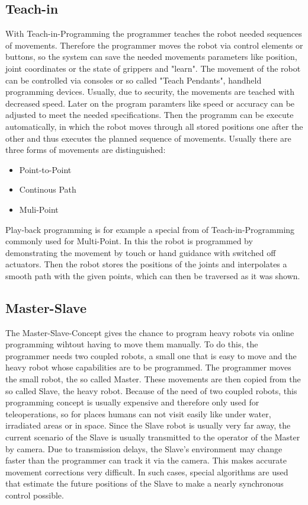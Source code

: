 \documentclass[conference]{IEEEtran}
\begin{document}
    \subsection{Teach-in}
        With Teach-in-Programming the programmer teaches the robot needed sequences of movements. Therefore the programmer moves the robot via control elements or buttons, so the system can save the needed movements parameters like position, joint coordinates or the state of grippers and "learn". The movement of the robot can be controlled via consoles or so called "Teach Pendants", handheld programming devices. %
        Usually, due to security, the movements are teached with decreased speed. Later on the program paramters like speed or accuracy can be adjusted to meet the needed specifications. Then the programm can be execute automatically, in which the robot moves through all stored positions one after the other and thus executes the planned sequence of movements. \cite[pp. 187-188]{b4} %
        Usually there are three forms of movements are distinguished:
        \begin{itemize}
            \item Point-to-Point
            \item Continous Path
            \item Muli-Point
        \end{itemize}

        Play-back programming is for example a special from of Teach-in-Programming commonly used for Multi-Point. In this the robot is programmed by demonstrating the movement by touch or hand guidance with switched off actuators. Then the robot stores the positions of the joints and interpolates a smooth path with the given points, which can then be traversed as it was shown. \cite[pp. 188-189]{b4}%

    \subsection{Master-Slave}
        The Master-Slave-Concept gives the chance to program heavy robots via online programming wihtout having to move them manually. To do this, the programmer needs two coupled robots, a small one that is easy to move and the heavy robot whose capabilities are to be programmed. The programmer moves the small robot, the so called Master. These movements are then copied from the so called Slave, the heavy robot. Because of the need of two coupled robots, this programming concept is usually expensive and therefore only used for teleoperations, so for places humans can not visit easily like under water, irradiated areas or in space. Since the Slave robot is usually very far away, the current scenario of the Slave is usually transmitted to the operator of the Master by camera. Due to transmission delays, the Slave's environment may change faster than the programmer can track it via the camera. This makes accurate movement corrections very difficult. In such cases, special algorithms are used that estimate the future positions of the Slave to make a nearly synchronous control possible. \cite[p. 91]{b6}%
\end{document}

